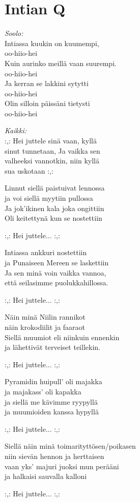 \section{Intian Q}

\textit{Soolo:}\\
Intiassa kuukin on kuumempi,\\
oo-hiio-hei\\
Kuin aurinko meillä vaan suurempi.\\
oo-hiio-hei\\
Ja kerran se lakkini sytytti\\
oo-hiio-hei\\
Olin silloin päissäni tietysti\\
oo-hiio-hei

\textit{Kaikki:}\\
:,: Hei juttele sinä vaan, kyllä\\
sinut tunnetaan, Ja vaikka sen\\
valheeksi vannotkin, niin kyllä\\
sua uskotaan :,:


Linnut siellä paistuivat lennossa\\
ja voi siellä myytiin pullossa\\
Ja jok’ikinen kala joka ongittiin\\
Oli keitettynä kun se nostettiin


:,: Hei juttele... :,:


Intiassa ankkuri nostettiin\\
ja Punaiseen Mereen se laskettiin\\
Ja sen minä voin vaikka vannoa,\\
että seilasimme puolukkahillossa.


:,: Hei juttele... :,:


Näin minä Niilin rannikot\\
näin krokodiilit ja faaraot\\
Siellä muumiot eli niinkuin ennenkin\\
ja lähettivät terveiset teillekin.


:,: Hei juttele... :,:


Pyramidin huipull' oli majakka\\
ja majakass' oli kapakka\\
ja siellä me kävimme ryypyllä\\
ja muumioiden kanssa hypyllä


:,: Hei juttele... :,:


Siellä näin minä toimarityttösen/poikasen\\
niin sievän hennon ja herttaisen\\
vaan yks' majuri juoksi mun perääni\\
ja halkaisi sauvalla kalloni


:,: Hei juttele... :,: